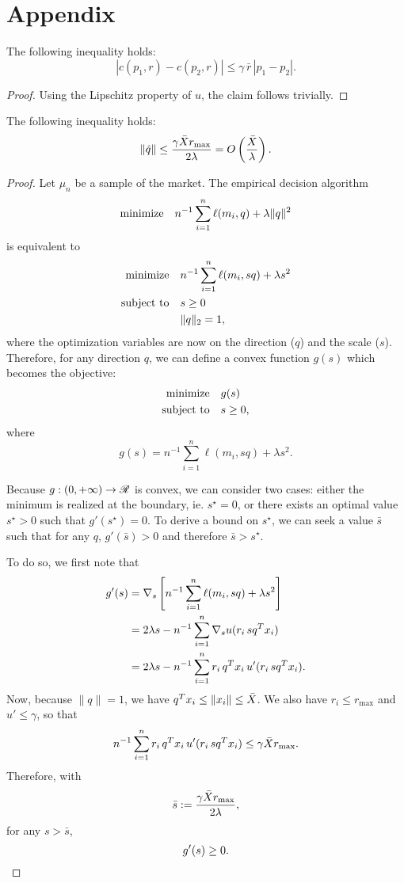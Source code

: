 \section*{Appendix}
\begin{claim}
  \label{sigma_admissibility}
  The following inequality holds:
  \[
    |c(p_1,r) - c(p_2,r)| \leq \gamma\,\bar r\,|p_1-p_2|.
  \]
\end{claim}
\begin{proof}
  Using the Lipschitz property of $u$, the claim follows trivially.
\end{proof}


\begin{claim}
  \label{q_bound}
  The following inequality holds:
  \[
    \|\hat q\| \leq \frac{\gamma\bar X r_{\max}}{2\lambda} = O\left(\frac{\bar X}{\lambda}\right).
  \]
\end{claim}
\begin{proof}
  Let $\mu_n$ be a sample of the market. The empirical decision algorithm 
  \[
    \text{minimize} \quad {n^{-1}\sum_{i=1}^n\ell(m_i,q) + \lambda\|q\|^2}
  \]
  is equivalent to 
  \begin{align*}
    \minimizeEquationSt{n^{-1}\sum_{i=1}^n \ell(m_i,sq) + \lambda s^2}[s\geq0\\,\|q\|_2=1],
  \end{align*}
  where the optimization variables are now on the direction ($q$) and the scale
  ($s$). Therefore, for any direction $q$, we can define a convex function $g(s)$ which
  becomes the objective:
  \begin{align*}
    \minimizeEquationSt{g(s)}[s\geq 0],
  \end{align*}
  where
  \[
    g(s) = n^{-1}\sum_{i=1}^n \ell(m_i, sq) + \lambda s^2.
  \]
  
  Because $g:(0,+\infty)\to\mathscr{R}$ is convex, we can consider two cases: either the minimum
  is realized at the boundary, ie. $s^\star=0$, or there exists an optimal value
  $s^\star > 0$ such that $g'(s^\star)=0$. To derive a bound on $s^\star$, we can seek a
  value $\bar s$ such that for any $q$, $g'(\bar s)>0$ and therefore $\bar s > s^\star$.

  To do so, we first note that 
  \begin{align*}
    g'(s) &= \nabla_s \left[n^{-1}\sum_{i=1}^n\ell(m_i,sq) + \lambda s^2\right]\\
          &= 2\lambda s - n^{-1}\sum_{i=1}^n \nabla_s u(r_i\,sq^Tx_i)\\
          &= 2\lambda s - n^{-1}\sum_{i=1}^n r_i\,q^Tx_i \, u'(r_i\,sq^Tx_i).
  \end{align*}
  Now, because $\|q\|=1$, we have $q^Tx_i\leq\|x_i\|\leq\bar X$. We also have
  $r_i\leq r_{\max}$ and $u'\leq\gamma$, so that
  \[
    n^{-1}\sum_{i=1}^n r_i\,q^Tx_i \, u'(r_i\,sq^Tx_i) \leq \gamma\bar X r_{\max}.
  \]
  Therefore, with
  \[
    \bar s := \frac{\gamma\bar X r_{\max}}{2\lambda},
  \]
  for any $s>\bar s$,
  \[
    g'(s) \geq 0.\qedhere
  \]
\end{proof}

